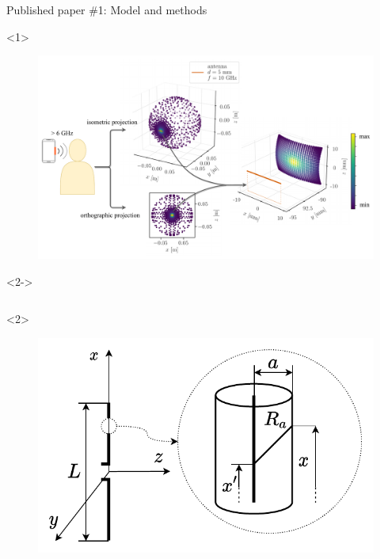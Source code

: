 \documentclass[xcolor=dvipsnames,10pt]{beamer}
\begin{document}
\begin{frame}{Published paper \#1: Model and methods}
    \begin{onlyenv}<1>
        \begin{figure}
            \centering
            \includegraphics[width=\textwidth]{artwork/IEEE-TEMC-exposure.pdf}
        \end{figure}
    \end{onlyenv}
    \begin{onlyenv}<2->
        \begin{columns}[c]
            \begin{column}{0.4\textwidth}
                \begin{onlyenv}<2>
                    \begin{center}
                    \begin{figure}
                        \includegraphics[width=\textwidth]{artwork/IEEE-TEMC-dipole.pdf}
                    \end{figure}

\end{center}
\end{onlyenv}
\end{column}
\end{columns}
\end{onlyenv}
\end{frame}
\end{document}
